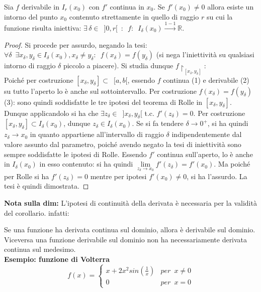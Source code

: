 \documentclass[10pt, oneside]{book}
\theoremstyle{plain}
\begin{document}
\begin{cor} Sia $f$ derivabile in $I_r(x_0)$ con $f'$ continua in $x_0$. Se $f'(x_0) \neq 0$ allora esiste un intorno del punto $x_0$ contenuto strettamente in quello di raggio $r$ su cui la funzione risulta iniettiva: $\exists \, \delta \in \enspace ]0, r[\enspace : \enspace f: \enspace I_\delta(x_0) \xrightarrow{1-1} \mathbb{R}$.
\end{cor}
\begin{proof}
Si procede per assurdo, negando la tesi: $\forall \delta \enspace \exists x_\delta, y_\delta \in I_\delta(x_0), x_\delta \neq y_\delta : \enspace f(x_\delta) = f(y_\delta)$ (si nega l'iniettività su qualsiasi intorno di raggio $\delta$ piccolo a piacere). Si studia dunque $f\restriction_{[x_\delta, y_\delta]}$: \\Poiché per costruzione $[x_\delta, y_\delta] \subset \enspace [a, b[$, essendo $f$ continua (1) e derivabile (2) su tutto l'aperto lo è anche sul sottointervallo. Per costruzione $f(x_\delta) = f(y_\delta)$ (3): sono quindi soddisfatte le tre ipotesi del teorema di Rolle in $[x_\delta, y_\delta]$. Dunque applicandolo si ha che $\exists z_\delta \in \enspace ]x_\delta, y_\delta[$ t.c. $f'(z_\delta) = 0$. Per costruzione $[x_\delta, y_\delta] \subset I_\delta(x_0)$, dunque $z_\delta \in I_\delta(x_0)$. Se si fa tendere $\delta \rightarrow 0^+$, si ha quindi $z_\delta \rightarrow x_0$ in quanto appartiene all'intervallo di raggio $\delta$ indipendentemente dal valore assunto dal parametro, poiché avendo negato la tesi di iniettività sono sempre soddisfatte le ipotesi di Rolle. Essendo $f'$ continua sull'aperto, lo è anche in $I_\delta(x_0)$ in esso contenuto: si ha quindi $\lim \limits_{z_\delta \rightarrow x_0} f'(z_\delta) = f'(x_0)$. Ma poiché per Rolle si ha $f'(z_\delta) = 0$ mentre per ipotesi $f'(x_0) \neq 0$, si ha l'assurdo. La tesi è quindi dimostrata.
\end{proof}
\textbf{Nota sulla dim:} L'ipotesi di continuità della derivata è necessaria per la validità del corollario. infatti:
\begin{oss} Se una funzione ha derivata continua sul dominio, allora è derivabile sul dominio. Viceversa una funzione derivabile sul dominio non ha necessariamente derivata continua sul medesimo.\\
\textbf{Esempio: funzione di Volterra}
\[f(x) = \begin{cases}
  x + 2 x^2 sin(\frac{1}{x}) &{per} \enspace x \neq 0 \\
  0 &{per} \enspace x = 0
\end{cases}\]
\end{oss}
\end{document}
